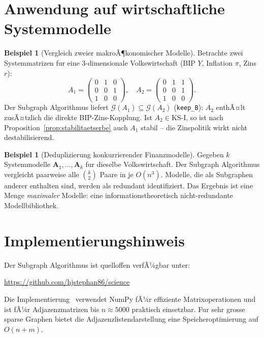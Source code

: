 ﻿\documentclass[12pt, a4paper, titlepage]{report}
\theoremstyle{definition}
\newtheorem{example}[theorem]{Beispiel}
\theoremstyle{remark}
\newcommand{\vA}{\bm{A}}
\newcommand{\KS}{\mathrm{KS}}
\begin{document}
\section{Anwendung auf wirtschaftliche Systemmodelle}

\begin{example}[Vergleich zweier makroÃ¶konomischer Modelle]
Betrachte zwei Systemmatrizen fur eine 3-dimensionale Volkswirtschaft
(BIP $Y$, Inflation $\pi$, Zins $r$):
\[
  A_1 = \begin{pmatrix} 0 & 1 & 0 \\ 0 & 0 & 1 \\ 1 & 0 & 0 \end{pmatrix},
  \quad
  A_2 = \begin{pmatrix} 0 & 1 & 1 \\ 0 & 0 & 1 \\ 1 & 0 & 0 \end{pmatrix}.
\]
Der Subgraph Algorithmus liefert $\mathcal{G}(A_1) \subseteq \mathcal{G}(A_2)$
(\texttt{keep\_B}): $A_2$ enthÃ¤lt zusÃ¤tzlich die direkte BIP-Zins-Kopplung.
Ist $A_2 \in \KS\text{-I}$, so ist nach Proposition~\ref{prop:stabilitaetserbe}
auch $A_1$ stabil -- die Zinspolitik wirkt nicht destabilisierend.
\end{example}

\begin{example}[Deduplizierung konkurrierender Finanzmodelle]
Gegeben $k$ Systemmodelle $\vA_1,\ldots,\vA_k$ fur dieselbe Volkswirtschaft.
Der Subgraph Algorithmus vergleicht paarweise alle $\binom{k}{2}$ Paare in je
$O(n^3)$. Modelle, die als Subgraphen anderer enthalten sind, werden als
redundant identifiziert. Das Ergebnis ist eine Menge \emph{maximaler} Modelle:
eine informationstheoretisch nicht-redundante Modellbibliothek.
\end{example}

\section{Implementierungshinweis}

Der Subgraph Algorithmus ist quelloffen verfÃ¼gbar unter:
\begin{center}
\url{https://github.com/hjstephan86/science}
\end{center}
Die Implementierung~\citep{epp2026subgraph} verwendet NumPy fÃ¼r effiziente
Matrixoperationen und ist fÃ¼r Adjazenzmatrizen bis $n \approx 5000$ praktisch
einsetzbar. Fur sehr grosse sparse Graphen bietet die Adjazenzlistendarstellung
eine Speicheroptimierung auf $O(n + m)$.
\end{document}
